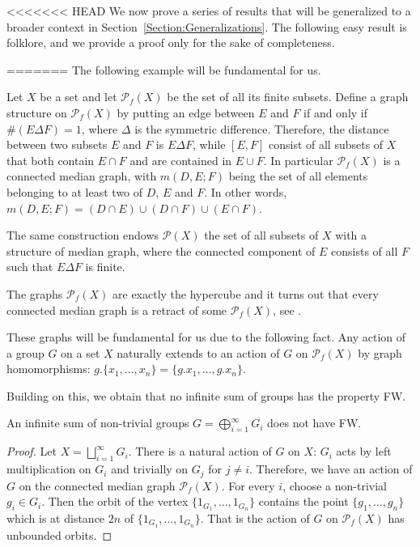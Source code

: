 <<<<<<< HEAD
We now prove a series of results that will be generalized to a broader context in Section~\ref{Section:Generalizations}.
The following easy result is folklore, and we provide a proof only for the sake of completeness.
\begin{lem}\label{Lemma:Subgroup}
=======
The following example will be fundamental for us.
\begin{exmp}
Let $X$ be a set and let  $\mathcal P_f(X)$ be the set of all its finite subsets.
Define a graph structure on $\mathcal P_f(X)$ by putting an edge between $E$ and $F$ if and only if $\#(E\Delta F)=1$, where $\Delta$ is the symmetric difference.
Therefore, the distance between two subsets $E$ and $F$ is $E\Delta F$, while $[E,F]$ consist of all subsets of $X$ that both contain $E\cap F$ and are contained in $E\cup F$.
In particular $\mathcal P_f(X)$ is a connected median graph, with $m(D,E;F)$ being the set of all elements belonging to at least two of $D$, $E$ and $F$. In other words,
$m(D,E;F)=(D\cap E)\cup(D\cap F)\cup(E\cap F)$.

The same construction endows $\mathcal P(X)$ the set of all subsets of $X$ with a structure of median graph, where the connected component of $E$ consists of all $F$ such that $E\Delta F$ is finite.
\end{exmp}

The graphs $\mathcal P_f(X)$ are exactly the hypercube and it turns out that every connected median graph is a retract of some $\mathcal P_f(X)$, see \cite{Bandelt1984}.

These graphs will be fundamental for us due to the following fact.
Any action of a group $G$ on a set $X$ naturally extends to an action of $G$ on $\mathcal P_f(X)$ by graph homomorphisms: $g.\{x_1,\dots,x_n\}=\{g.x_1,\dots,g.x_n\}$.


Building on this, we obtain that no infinite sum of groups has the property FW.
\begin{lem}\label{Lemma:Sum}
An infinite sum of non-trivial groups $G=\bigoplus_{i=1}^\infty G_i$ does not have FW.
\end{lem}
\begin{proof}
Let $X=\bigsqcup_{i=1}^\infty G_i$.
There is a natural action of $G$ on $X$: $G_i$ acts by left multiplication on $G_i$ and trivially on $G_j$ for $j\neq i$.
Therefore, we have an action of $G$ on the connected median graph $\mathcal P_f(X)$.
For every $i$, choose a non-trivial $g_i\in G_i$.
Then the orbit of the vertex $\{1_{G_1},\dots, 1_{G_n}\}$ contains the point $\{g_1,\dots, g_n\}$ which is at distance $2n$ of $\{1_{G_1},\dots, 1_{G_n}\}$.
That is the action of $G$ on $\mathcal P_f(X)$ has unbounded orbits.
\end{proof}


\end{lem}
